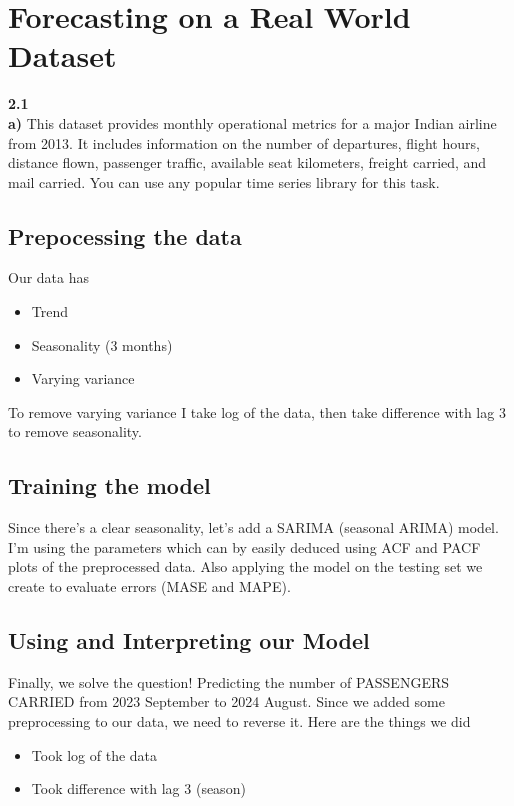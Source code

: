 \section{Forecasting on a Real World Dataset}
\textbf{2.1}\\
\textbf{a)}
This dataset provides monthly operational metrics for a major Indian airline from 2013. It includes information on the number of departures, flight hours, distance flown, passenger traffic, available seat kilometers, freight carried, and mail carried. You can use any popular time series library for this task. 
\subsection{Prepocessing the data}
Our data has
\begin{itemize}
    \item Trend
    \item Seasonality (3 months)
    \item Varying variance
\end{itemize}

To remove varying variance I take log of the data, then take difference with lag 3 to remove seasonality.
\subsection{Training the model}
Since there's a clear seasonality, let's add a SARIMA (seasonal ARIMA) model. I'm using the parameters which can by easily deduced using ACF and PACF plots of the preprocessed data. Also applying the model on the testing set we create to evaluate errors (MASE and MAPE).
\subsection{Using and Interpreting our Model}
Finally, we solve the question! Predicting the number of PASSENGERS CARRIED from 2023 September to 2024 August. Since we added some preprocessing to our data, we need to reverse it. Here are the things we did
\begin{itemize}
    \item Took log of the data
    \item Took difference with lag 3 (season)
\end{itemize}

